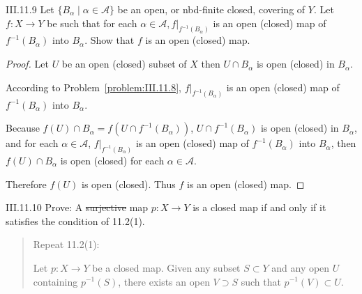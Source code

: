 \begin{problem}{III.11.9}
Let \(\{ B_{\alpha} \mid \alpha \in \mathscr{A} \}\) be an open, or nbd-finite closed, covering of \( Y \). Let \( f: X \to Y \) be such that for each \( \alpha \in \mathscr{A}, f\vert_{f^{-1}(B_{\alpha})} \) is an open (closed) map of \( f^{-1}(B_{\alpha}) \) into \( B_{\alpha} \). Show that \( f \) is an open (closed) map.
\end{problem}

\begin{proof}
	Let \( U \) be an open (closed) subset of \( X \) then \( U \cap B_{\alpha} \) is open (closed) in \( B_{\alpha} \).

	According to Problem~\ref{problem:III.11.8}, \( f\vert_{f^{-1}(B_{\alpha})} \) is an open (closed) map of \( f^{-1}(B_{\alpha}) \) into \( B_{\alpha} \).

	Because \( f(U) \cap B_{\alpha} = f(U \cap f^{-1}(B_{\alpha})) \), \( U \cap f^{-1}(B_{\alpha}) \) is open (closed) in \( B_{\alpha} \), and for each \( \alpha \in \mathscr{A} \), \( f\vert_{f^{-1}(B_{\alpha})} \) is an open (closed) map of \( f^{-1}(B_{\alpha}) \) into \( B_{\alpha} \), then \( f(U) \cap B_{\alpha} \) is open (closed) for each \( \alpha \in \mathscr{A} \).

	Therefore \( f(U) \) is open (closed). Thus \( f \) is an open (closed) map.
\end{proof}

\begin{problem}{III.11.10}\label{problem:III.11.10}
Prove: A \st{surjective} map \( p: X \to Y \) is a closed map if and only if it satisfies the condition of 11.2(1).
\end{problem}

\begin{quote}
	Repeat 11.2(1):

	Let \( p: X \to Y \) be a closed map. Given any subset \( S \subset Y \) and any open \( U \) containing \( p^{-1}(S) \), there exists an open \( V \supset S \) such that \( p^{-1}(V) \subset U \).
\end{quote}

